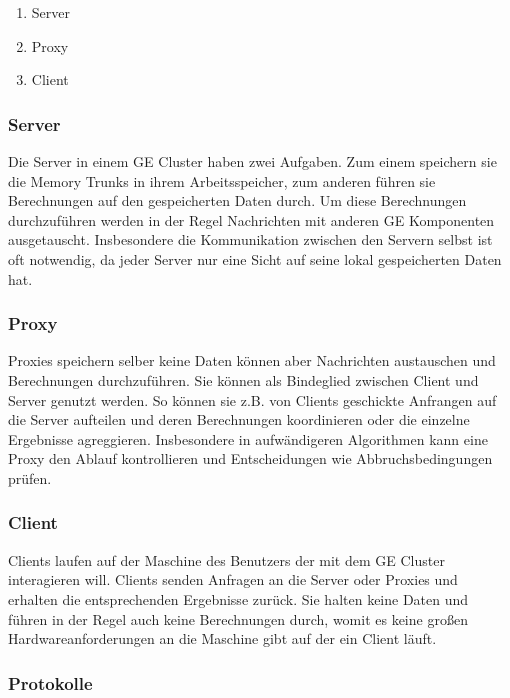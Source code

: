 \begin{enumerate}
  \item Server
  \item Proxy
  \item Client
\end{enumerate}


\subsubsection{Server}

Die Server in einem GE Cluster haben zwei Aufgaben. Zum einem speichern sie die Memory Trunks in ihrem Arbeitsspeicher, 
zum anderen führen sie Berechnungen auf den gespeicherten Daten durch.
Um diese Berechnungen durchzuführen werden in der Regel Nachrichten mit anderen GE Komponenten ausgetauscht. Insbesondere die Kommunikation zwischen den Servern
selbst ist oft notwendig, da jeder Server nur eine Sicht auf seine lokal gespeicherten Daten hat.

\subsubsection{Proxy}

Proxies speichern selber keine Daten können aber Nachrichten austauschen und Berechnungen durchzuführen. Sie können als 
Bindeglied zwischen Client und Server genutzt werden. So können sie z.B. von Clients geschickte Anfrangen auf die Server aufteilen und deren
Berechnungen koordinieren oder die einzelne Ergebnisse agreggieren. Insbesondere in aufwändigeren Algorithmen kann eine Proxy 
den Ablauf kontrollieren und Entscheidungen wie Abbruchsbedingungen prüfen.

\subsubsection{Client}

Clients laufen auf der Maschine des Benutzers der mit dem GE Cluster interagieren will. Clients senden Anfragen an die Server oder Proxies und
erhalten die entsprechenden Ergebnisse zurück. Sie halten keine Daten und führen in der Regel auch keine Berechnungen durch, womit es keine großen Hardwareanforderungen
an die Maschine gibt auf der ein Client läuft.

\subsubsection{Protokolle}

